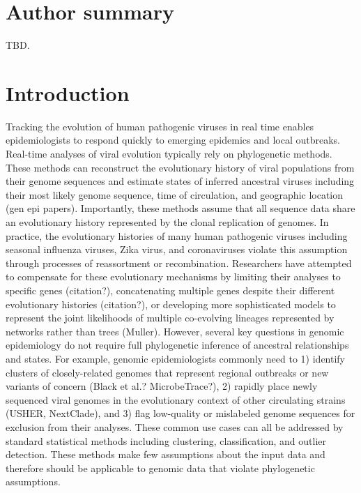 \documentclass[10pt,letterpaper]{article}
\begin{document}
\section*{Author summary}
TBD.

\linenumbers

\section*{Introduction}

Tracking the evolution of human pathogenic viruses in real time enables epidemiologists to respond quickly to emerging epidemics and local outbreaks.
Real-time analyses of viral evolution typically rely on phylogenetic methods.
These methods can reconstruct the evolutionary history of viral populations from their genome sequences and estimate states of inferred ancestral viruses including their most likely genome sequence, time of circulation, and geographic location (gen epi papers).
Importantly, these methods assume that all sequence data share an evolutionary history represented by the clonal replication of genomes.
In practice, the evolutionary histories of many human pathogenic viruses including seasonal influenza viruses, Zika virus, and coronaviruses violate this assumption through processes of reassortment or recombination.
Researchers have attempted to compensate for these evolutionary mechanisms by limiting their analyses to specific genes (citation?), concatenating multiple genes despite their different evolutionary histories (citation?), or developing more sophisticated models to represent the joint likelihoods of multiple co-evolving lineages represented by networks rather than trees (Muller).
However, several key questions in genomic epidemiology do not require full phylogenetic inference of ancestral relationships and states.
For example, genomic epidemiologists commonly need to 1) identify clusters of closely-related genomes that represent regional outbreaks or new variants of concern (Black et al.? MicrobeTrace?), 2) rapidly place newly sequenced viral genomes in the evolutionary context of other circulating strains (USHER, NextClade), and 3) flag low-quality or mislabeled genome sequences for exclusion from their analyses.
These common use cases can all be addressed by standard statistical methods including clustering, classification, and outlier detection.
These methods make few assumptions about the input data and therefore should be applicable to genomic data that violate phylogenetic assumptions.
\end{document}
